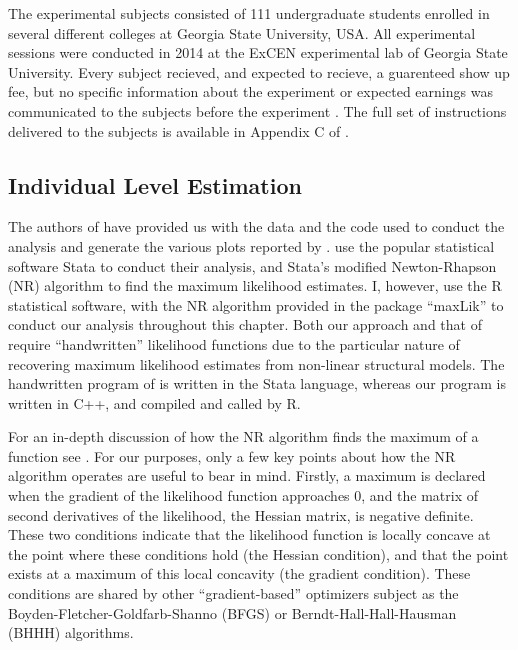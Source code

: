 \documentclass[../main.tex]{subfiles}
\begin{document}
The experimental subjects consisted of 111 undergraduate students enrolled in several different colleges at Georgia State University, USA.
All experimental sessions were conducted in 2014 at the ExCEN experimental lab of Georgia State University.
Every subject recieved, and expected to recieve, a guarenteed  show up fee, but no specific information about the experiment or expected earnings was communicated to the subjects before the experiment \parencite[98]{Harrison2016}.
The full set of instructions delivered to the subjects is available in Appendix C of \textcite{Harrison2016}.

\subsection{Individual Level Estimation}
\label{sec4:ILE}

The authors of \textcite{Harrison2016} have provided us with the data and the code used to conduct the analysis and generate the various plots reported by \textcite{Harrison2016}.
\textcite{Harrison2016} use the popular statistical software Stata to conduct their analysis, and Stata's modified Newton-Rhapson (NR) algorithm to find the maximum likelihood estimates.
I, however, use the R statistical software, with the NR algorithm provided in the package \enquote{maxLik} to conduct our analysis throughout this chapter.
Both our approach and that of \textcite{Harrison2016} require \enquote{handwritten} likelihood functions due to the particular nature of recovering maximum likelihood estimates from non-linear structural models.
The handwritten program of \textcite{Harrison2016} is written in the Stata language, whereas our program is written in C++, and compiled and called by R.

For an in-depth discussion of how the NR algorithm finds the maximum of a function see \textcite[213-219]{Train2002}.
For our purposes, only a few key points about how the NR algorithm operates are useful to bear in mind.
Firstly, a maximum is declared when the gradient of the likelihood function approaches 0, and the matrix of second derivatives of the likelihood, the Hessian matrix, is negative definite.
These two conditions indicate that the likelihood function is locally concave at the point where these conditions hold (the Hessian condition), and that the point exists at a maximum of this local concavity (the gradient condition).
These conditions are shared by other \enquote{gradient-based} optimizers subject as the Boyden-Fletcher-Goldfarb-Shanno (BFGS) or Berndt-Hall-Hall-Hausman (BHHH) algorithms.
\end{document}
